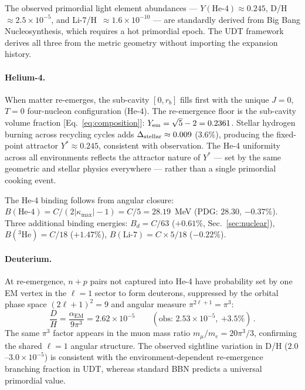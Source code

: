 \documentclass[aps,prd,twocolumn,superscriptaddress,nofootinbib,longbibliography]{revtex4-2}
\newcommand{\kmax}{|\kappa_{\mathrm{max}}|}
\newcommand{\aEM}{\alpha_{\mathrm{EM}}}
\begin{document}
The observed primordial light element abundances --- $Y(\text{He-4})
\approx 0.245$, D/H~$\approx 2.5 \times 10^{-5}$, and
Li-7/H~$\approx 1.6 \times 10^{-10}$ --- are standardly derived from
Big Bang Nucleosynthesis, which requires a hot primordial epoch.  The
UDT framework derives all three from the metric geometry without
importing the expansion history.

\paragraph{Helium-4.}  When matter re-emerges, the sub-cavity
$[0, r_b]$ fills first with the unique $J=0$, $T=0$ four-nucleon
configuration (He-4).  The re-emergence floor is the sub-cavity
volume fraction [Eq.~\eqref{eq:composition}]:
$Y_{\rm em} = \sqrt{5}-2 = 0.2361$.  Stellar hydrogen burning
across recycling cycles adds $\Delta_{\rm stellar} \approx 0.009$
($3.6\%$), producing the fixed-point attractor $Y^* \approx 0.245$,
consistent with observation.  The He-4 uniformity across all
environments reflects the attractor nature of $Y^*$ --- set by the
same geometric and stellar physics everywhere --- rather than a single
primordial cooking event.

The He-4 binding follows from angular closure:
$B(\text{He-4}) = C/(2\kmax-1) = C/5 = 28.19$~MeV
(PDG: $28.30$, $-0.37\%$).  Three additional binding energies:
$B_d = C/63$ ($+0.61\%$, Sec.~\ref{sec:nuclear}),
$B({}^3\text{He}) = C/18$ ($+1.47\%$),
$B(\text{Li-7}) = C \times 5/18$ ($-0.22\%$).

\paragraph{Deuterium.}  At re-emergence, $n\!+\!p$ pairs not captured
into He-4 have probability set by one EM vertex in the $\ell\!=\!1$
sector to form deuterons, suppressed by the orbital phase space
$(2\ell+1)^2 = 9$ and angular measure $\pi^{2\ell+1} = \pi^3$:
\begin{equation}\label{eq:DH}
  \frac{D}{H} = \frac{\aEM}{9\pi^3} = 2.62 \times 10^{-5}
  \qquad(\text{obs: }2.53 \times 10^{-5},\ {+3.5\%})\,.
\end{equation}
The same $\pi^3$ factor appears in the muon mass ratio
$m_\mu/m_e = 20\pi^3/3$, confirming the shared $\ell=1$ angular
structure.  The observed sightline variation in D/H
($2.0$--$3.0 \times 10^{-5}$) is consistent with the
environment-dependent re-emergence branching fraction in UDT, whereas
standard BBN predicts a universal primordial value.
\end{document}

